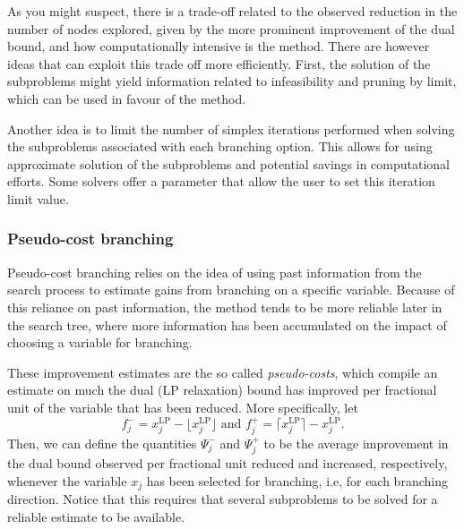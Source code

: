 As you might suspect, there is a trade-off related to the observed reduction in the number of nodes explored, given by the more prominent improvement of the dual bound, and how computationally intensive is the method. There are however ideas that can exploit this trade off more efficiently. First, the solution of the subproblems might yield information related to infeasibility and pruning by limit, which can be used in favour of the method. 

Another idea is to limit the number of simplex iterations performed when solving the subproblems associated with each branching option. This allows for using approximate solution of the subproblems and potential savings in computational efforts. Some solvers offer a parameter that allow the user to set this iteration limit value.


\subsubsection{Pseudo-cost branching}

Pseudo-cost branching relies on the idea of using past information from the search process to estimate gains from branching on a specific variable. Because of this reliance on past information, the method tends to be more reliable later in the search tree, where more information has been accumulated on the impact of choosing a variable for branching.

These improvement estimates are the so called \emph{pseudo-costs}, which compile an estimate on much the dual (LP relaxation) bound has improved per fractional unit of the variable that has been reduced. More specifically, let 
%
\begin{equation} \label{p1c11:eq:fractionals}
	f^{-}_j = x^{\text{LP}}_j - \lfloor x^{\text{LP}}_j \rfloor \text{ and } f^{+}_j = \lceil x^{\text{LP}}_j \rceil - x^{\text{LP}}_j.	
\end{equation}
%
Then, we can define the quantities $\Psi^-_j$ and $\Psi^+_j$ to be the average improvement in the dual bound observed per fractional unit reduced and increased, respectively, whenever the variable $x_j$ has been selected for branching, i.e, for each branching direction. Notice that this requires that several subproblems to be solved for a reliable estimate to be available.


